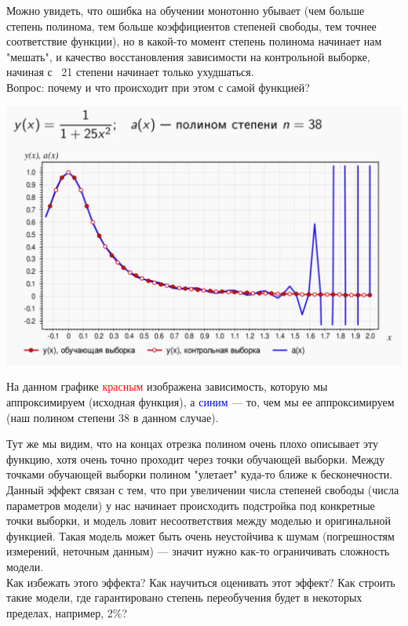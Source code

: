 \documentclass{article}
\begin{document}
Можно увидеть, что ошибка на обучении монотонно убывает (чем больше степень полинома, тем больше коэффициентов степеней свободы, тем точнее соответствие функции), но в какой-то момент степень полинома начинает нам "мешать", и качество восстановления зависимости на контрольной выборке, начиная с ~21 степени начинает только ухудшаться.
\\

Вопрос: почему и что происходит при этом с самой функцией?

\begin{center}
    \includegraphics[scale=0.395]{2_5.png}
\end{center}

На данном графике \textcolor{red}{красным} изображена зависимость, которую мы аппроксимируем (исходная функция), а \textcolor{blue}{синим} --- то, чем мы ее аппроксимируем (наш полином степени 38 в данном случае).

Тут же мы видим, что на концах отрезка полином очень плохо описывает эту функцию, хотя очень точно проходит через точки обучающей выборки. Между точками обучающей выборки полином "улетает" куда-то ближе к бесконечности.
\\

Данный эффект связан с тем, что при увеличении числа степеней свободы (числа параметров модели) у нас начинает происходить подстройка под конкретные точки выборки, и модель ловит несоответствия между моделью и оригинальной функцией. Такая модель может быть очень неустойчива к шумам (погрешностям измерений, неточным данным) --- значит нужно как-то ограничивать сложность модели.
\\

Как избежать этого эффекта? Как научиться оценивать этот эффект? Как строить такие модели, где гарантировано степень переобучения будет в некоторых пределах, например, 2\%?
\end{document}
